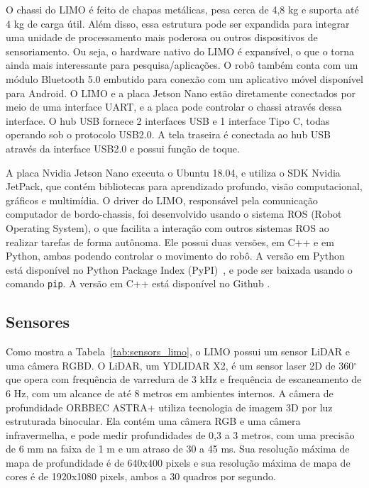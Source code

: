         O chassi do LIMO é feito de chapas metálicas, pesa cerca de 4,8 kg e suporta até 4 kg de carga útil. Além disso, essa estrutura pode ser expandida para integrar uma unidade de processamento mais poderosa ou outros dispositivos de sensoriamento. Ou seja, o hardware nativo do LIMO é expansível, o que o torna ainda mais interessante para pesquisa/aplicações. O robô também conta com um módulo Bluetooth 5.0 embutido para conexão com um aplicativo móvel disponível para Android. O LIMO e a placa Jetson Nano estão diretamente conectados por meio de uma interface UART, e a placa pode controlar o chassi através dessa interface. O hub USB fornece 2 interfaces USB e 1 interface Tipo C, todas operando sob o protocolo USB2.0. A tela traseira é conectada ao hub USB através da interface USB2.0 e possui função de toque.

        A placa Nvidia Jetson Nano executa o Ubuntu 18.04, e utiliza o SDK Nvidia JetPack, que contém bibliotecas para aprendizado profundo, visão computacional, gráficos e multimídia. O driver do LIMO, responsável pela comunicação computador de bordo-chassis, foi desenvolvido usando o sistema ROS (Robot Operating System), o que facilita a interação com outros sistemas ROS ao realizar tarefas de forma autônoma. Ele possui duas versões, em C++ e em Python, ambas podendo controlar o movimento do robô. A versão em Python está disponível no Python Package Index (PyPI)~\cite{limoRosPy}, e pode ser baixada usando o comando \texttt{pip}. A versão em C++ está disponível no Github \cite{limoRos1}.


    \subsection{Sensores}
    \label{sec:Sensores_LIMO}
        Como mostra a Tabela~\ref{tab:sensors_limo}, o LIMO possui um sensor LiDAR e uma câmera RGBD. O LiDAR, um YDLIDAR X2, é um sensor laser 2D de 360$^\circ$ que opera com frequência de varredura de 3 kHz e frequência de escaneamento de 6 Hz, com um alcance de até 8 metros em ambientes internos. 
        A câmera de profundidade ORBBEC ASTRA+ utiliza tecnologia de imagem 3D por luz estruturada binocular. Ela contém uma câmera RGB e uma câmera infravermelha, e pode medir profundidades de 0,3 a 3 metros, com uma precisão de 6 mm na faixa de 1 m e um atraso de 30 a 45 ms. Sua resolução máxima de mapa de profundidade é de 640x400 pixels e sua resolução máxima de mapa de cores é de 1920x1080 pixels, ambos a 30 quadros por segundo.
    
